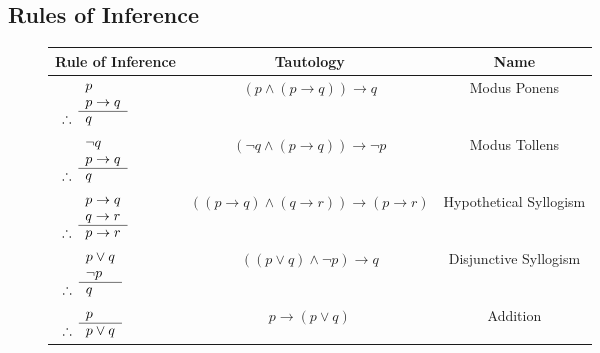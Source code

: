 \documentclass[article, 11pt]{article}
\theoremstyle{definition}
\begin{document}
    \subsection{Rules of Inference}
    \begin{figure}[H]
        \centering
        \begin{tabular}{|l|c|c|}
            \hline
            Rule of Inference & Tautology & Name \\
            \hline
            $\begin{array}{rl}
                & p \\
                & p \to q \\
                \cline{2-2}
                \therefore & q
            \end{array}$ & $(p \land (p \to q)) \to q$ & Modus Ponens \\
            \hline
            $\begin{array}{rl}
                & \neg q \\
                & p \to q \\
                \cline{2-2}
                \therefore & q 
            \end{array}$ & $(\neg q \land (p \to q)) \to \neg p$ & Modus Tollens \\
            \hline
            $\begin{array}{rl}
                & p \to q \\
                & q \to r \\
                \cline{2-2}
                \therefore & p \to r
            \end{array}$ & $((p \to q) \land (q \to r)) \to (p \to r)$ & Hypothetical Syllogism \\
            \hline
            $\begin{array}{rl}
                & p \lor q \\
                & \neg p \\
                \cline{2-2}
                \therefore & q
            \end{array}$ & $((p \lor q) \land \neg p) \to q$ & Disjunctive Syllogism \\
            \hline
            $\begin{array}{rl}
                & p \\
                \cline{2-2}
                \therefore & p \lor q
            \end{array}$ & $p \to (p \lor q)$ & Addition \\

\end{tabular}
\end{figure}
\end{document}
